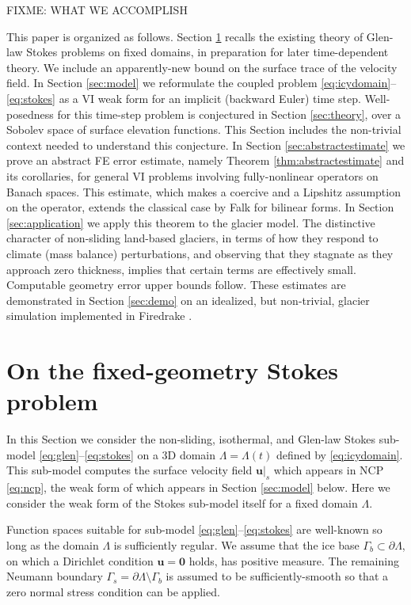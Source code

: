 \documentclass[hidelinks,onefignum,onetabnum,final]{siamart220329}  %
\newcommand{\bu}{\mathbf{u}}
\newcommand{\bzero}{\bm{0}}
\begin{document}
FIXME: WHAT WE ACCOMPLISH

This paper is organized as follows.  Section \ref{sec:stokes} recalls the existing theory of Glen-law Stokes problems on fixed domains, in preparation for later time-dependent theory.  We include an apparently-new bound on the surface trace of the velocity field.  In Section \ref{sec:model} we reformulate the coupled problem \eqref{eq:icydomain}--\eqref{eq:stokes} as a VI weak form for an implicit (backward Euler) time step.  Well-posedness for this time-step problem is conjectured in Section \ref{sec:theory}, over a Sobolev space of surface elevation functions.  This Section includes the non-trivial context needed to understand this conjecture.  In Section \ref{sec:abstractestimate} we prove an abstract FE error estimate, namely Theorem \ref{thm:abstractestimate} and its corollaries, for general VI problems involving fully-nonlinear operators on Banach spaces.  This estimate, which makes a coercive and a Lipshitz assumption on the operator, extends the classical case by Falk \cite{Falk1974} for bilinear forms.  In Section \ref{sec:application} we apply this theorem to the glacier model.  The distinctive character of non-sliding land-based glaciers, in terms of how they respond to climate (mass balance) perturbations, and observing that they stagnate as they approach zero thickness, implies that certain terms are effectively small.  Computable geometry error upper bounds follow.  These estimates are demonstrated in Section \ref{sec:demo} on an idealized, but non-trivial, glacier simulation implemented in Firedrake \cite{Hametal2023}.


\section{On the fixed-geometry Stokes problem} \label{sec:stokes}

In this Section we consider the non-sliding, isothermal, and Glen-law Stokes sub-model \eqref{eq:glen}--\eqref{eq:stokes} on a 3D domain $\Lambda = \Lambda(t)$ defined by \eqref{eq:icydomain}.  This sub-model computes the surface velocity field $\bu|_s$ which appears in NCP \eqref{eq:ncp}, the weak form of which appears in Section \ref{sec:model} below.  Here we consider the weak form of the Stokes sub-model itself for a fixed domain $\Lambda$.

Function spaces suitable for sub-model \eqref{eq:glen}--\eqref{eq:stokes} are well-known so long as the domain $\Lambda$ is sufficiently regular.  We assume that the ice base $\Gamma_b\subset\partial \Lambda$, on which a Dirichlet condition $\bu=\bzero$ holds, has positive measure.  The remaining Neumann boundary $\Gamma_s = \partial \Lambda \setminus \Gamma_b$ is assumed to be sufficiently-smooth so that a zero normal stress condition can be applied.
\end{document}

